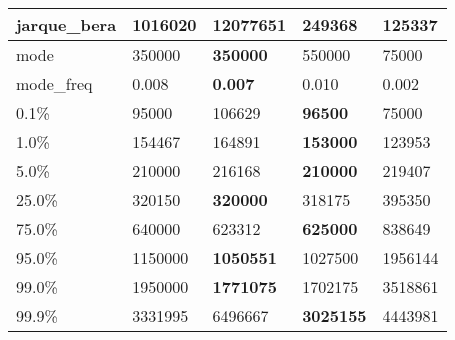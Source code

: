 \begin{table}[H]
\begin{tabular}{|l|m{10em}|m{10em}|m{10em}|m{10em}|}
\hline jarque\_bera & 1016020 & \cellcolor[rgb]{0.9, 0.54, 0.52} 12077651 & \bfseries 249368 & 125337 \\
\hline mode & 350000 & \bfseries 350000 & 550000 & \cellcolor[rgb]{0.9, 0.54, 0.52} 75000 \\
\hline mode\_freq & 0.008 & \bfseries 0.007 & 0.010 & \cellcolor[rgb]{0.9, 0.54, 0.52} 0.002 \\
\hline 0.1\% & 95000 & 106629 & \bfseries 96500 & \cellcolor[rgb]{0.9, 0.54, 0.52} 75000 \\
\hline 1.0\% & 154467 & 164891 & \bfseries 153000 & \cellcolor[rgb]{0.9, 0.54, 0.52} 123953 \\
\hline 5.0\% & 210000 & 216168 & \bfseries 210000 & \cellcolor[rgb]{0.9, 0.54, 0.52} 219407 \\
\hline 25.0\% & 320150 & \bfseries 320000 & 318175 & \cellcolor[rgb]{0.9, 0.54, 0.52} 395350 \\
\hline 75.0\% & 640000 & 623312 & \bfseries 625000 & \cellcolor[rgb]{0.9, 0.54, 0.52} 838649 \\
\hline 95.0\% & 1150000 & \bfseries 1050551 & 1027500 & \cellcolor[rgb]{0.9, 0.54, 0.52} 1956144 \\
\hline 99.0\% & 1950000 & \bfseries 1771075 & 1702175 & \cellcolor[rgb]{0.9, 0.54, 0.52} 3518861 \\
\hline 99.9\% & 3331995 & \cellcolor[rgb]{0.9, 0.54, 0.52} 6496667 & \bfseries 3025155 & 4443981 \\
\hline
\end{tabular}
\end{table}
